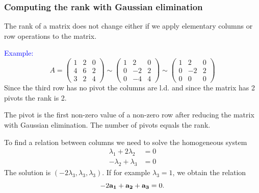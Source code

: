 \documentclass[11pt,aspectratio=169]{beamer}
\begin{document}
\begin{frame}
\frametitle{Computing the rank with Gaussian elimination}
\begin{small}
The rank of a matrix does not change either if we apply elementary columns or row operations to the matrix.

 \textcolor{blue}{Example:}
\begin{equation*}
A=\begin{pmatrix}
1 & 2 & 0\\
4 & 6 & 2 \\
3 & 2 & 4 \end{pmatrix} \sim \begin{pmatrix}
1 & 2 & 0\\
0 & -2 & 2 \\
0 & -4 & 4
\end{pmatrix} \sim 
\begin{pmatrix}
1 & 2 & 0\\
0 & -2 & 2 \\
0 & 0 & 0
\end{pmatrix}
\end{equation*}
Since the  third row has no pivot the columns are  l.d. and since the matrix has  2 pivots the  rank  is 2. \begin{tiny}The pivot is the first non-zero value of a non-zero row after reducing the matrix with Gaussian elimination. The number of pivots equals the rank. \end{tiny}

To find a relation between columns we need to solve the homogeneous system
\begin{equation*}
\begin{split}
\lambda_1+2\lambda_2&=0 \\
-\lambda_2+\lambda_3&=0 
\end{split}
\end{equation*}
The solution is $(-2\lambda_3, \lambda_3, \lambda_3)$. If for example $\lambda_3=1$, we obtain  the relation
$$
-2 {\bf a_1}+{\bf a_2}+{\bf a_3}=0.
$$


\end{small}
\end{frame}
\end{document}
